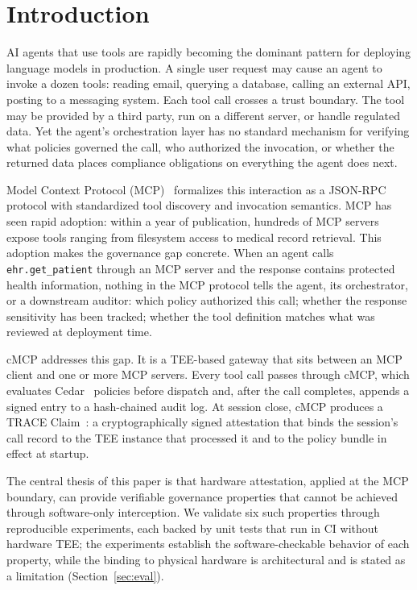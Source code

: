 \section{Introduction}
\label{sec:intro}

AI agents that use tools are rapidly becoming the dominant pattern for deploying language
models in production. A single user request may cause an agent to invoke a dozen tools:
reading email, querying a database, calling an external API, posting to a messaging system.
Each tool call crosses a trust boundary. The tool may be provided by a third party, run on
a different server, or handle regulated data. Yet the agent's orchestration layer has no
standard mechanism for verifying what policies governed the call, who authorized the
invocation, or whether the returned data places compliance obligations on everything the
agent does next.

Model Context Protocol (MCP)~\citep{mcp2024} formalizes this interaction as a JSON-RPC
protocol with standardized tool discovery and invocation semantics. MCP has seen rapid
adoption: within a year of publication, hundreds of MCP servers expose tools ranging from
filesystem access to medical record retrieval. This adoption makes the governance gap concrete.
When an agent calls \texttt{ehr.get\_patient} through an MCP server and the response contains
protected health information, nothing in the MCP protocol tells the agent, its orchestrator,
or a downstream auditor: which policy authorized this call; whether the response sensitivity
has been tracked; whether the tool definition matches what was reviewed at deployment time.

cMCP addresses this gap. It is a TEE-based gateway that sits between an MCP client and one or
more MCP servers. Every tool call passes through cMCP, which evaluates Cedar~\citep{cedar2023}
policies before dispatch and, after the call completes, appends a signed entry to a
hash-chained audit log. At session close, cMCP produces a TRACE Claim~\citep{trace2025}: a
cryptographically signed attestation that binds the session's call record to the TEE instance
that processed it and to the policy bundle in effect at startup.

The central thesis of this paper is that hardware attestation, applied at the MCP boundary,
can provide verifiable governance properties that cannot be achieved through software-only
interception. We validate six such properties through reproducible experiments, each backed by
unit tests that run in CI without hardware TEE; the experiments establish the
software-checkable behavior of each property, while the binding to physical hardware is
architectural and is stated as a limitation (Section~\ref{sec:eval}).

